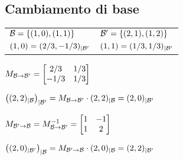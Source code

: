 \subsection{Cambiamento di base}
\begin{tabular}{ll}
	$\mathcal{B} = \{(1,0), (1,1)\}$ & $\mathcal{B}' = \{(2,1),(1,2)\}$ \\

	$(1,0) = (2/3,-1/3)_{|\mathcal{B}'}$ & $(1,1) = (1/3,1/3)_{|\mathcal{B}'}$ \\
\end{tabular}

$M_{\mathcal{B}\rightarrow \mathcal{B}'} =
\begin{bmatrix}
	2/3 & 1/3 \\
	-1/3 & 1/3 \\
\end{bmatrix}$

$\left((2,2)_{|\mathcal{B}}\right)_{|\mathcal{B}'} = M_{\mathcal{B}\rightarrow \mathcal{B}'} \cdot (2,2)_{|\mathcal{B}} = (2,0)_{|\mathcal{B}'}$

$M_{\mathcal{B}'\rightarrow \mathcal{B}} = M_{\mathcal{B}\rightarrow \mathcal{B}'}^{-1} =
\begin{bmatrix}
	1 & -1 \\
	1 & 2 \\
\end{bmatrix}$

$\left((2,0)_{|\mathcal{B}'}\right)_{|\mathcal{B}} = M_{\mathcal{B}'\rightarrow \mathcal{B}} \cdot (2,0)_{|\mathcal{B}} = (2,2)_{|\mathcal{B}'}$
